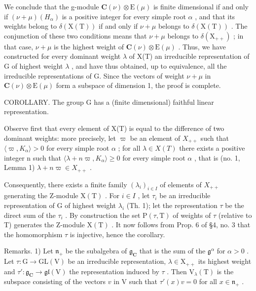 We conclude that the g-module \(\mathbf{C}(\nu)\otimes\mathrm{E}(\mu)\) is finite dimensional if and only if \((\nu+\mu)(H_{\alpha})\) is a positive integer for every simple root \(\alpha\) , and that its weights belong to \(\delta(\mathrm{X}(\mathrm{T}))\) if and only if \(\nu+\mu\) belongs to \(\delta(\mathrm{X}(\mathrm{T}))\) . The conjunction of these two conditions means that \(\nu+\mu\) belongs to \(\delta(\mathrm{X}_{++})\) ; in that case, \(\nu+\mu\) is the highest weight of \(\mathbf{C}(\nu)\otimes\mathrm{E}(\mu)\) . Thus, we have constructed for every dominant weight \(\lambda\) of X(T) an irreducible representation of G of highest weight \(\lambda\) , and have thus obtained, up to equivalence, all the irreducible representations of G. Since the vectors of weight \(\nu+\mu\) in \(\mathbf{C}(\nu)\otimes\mathrm{E}(\mu)\) form a subspace of dimension 1, the proof is complete.

COROLLARY. The group G has a (finite dimensional) faithful linear representation.

Observe first that every element of X(T) is equal to the difference of two dominant weights: more precisely, let \(\varpi\) be an element of \(X_{++}\) such that \(\langle\varpi,K_{\alpha}\rangle>0\) for every simple root \(\alpha\) ; for all \(\lambda\in X(T)\) there exists a positive integer n such that \(\langle\lambda+n\varpi,K_{\alpha}\rangle\geq0\) for every simple root \(\alpha\) , that is (no. 1, Lemma 1) \(\lambda+n\varpi\in X_{++}\) .

Consequently, there exists a finite family \((\lambda_{i})_{i\in I}\) of elements of \(X_{++}\) generating the Z-module \(\mathrm{X(T)}\) . For \(i\in I\) , let \(\tau_{i}\) be an irreducible representation of G of highest weight \(\lambda_{i}\) (Th. 1); let the representation \(\tau\) be the direct sum of the \(\tau_{i}\) . By construction the set \(\mathrm{P}(\tau,\mathrm{T})\) of weights of \(\tau\) (relative to T) generates the Z-module \(\mathrm{X(T)}\) . It now follows from Prop. 6 of §4, no. 3 that the homomorphism \(\tau\) is injective, hence the corollary.

Remarks. 1) Let \(\mathfrak{n}_{+}\) be the subalgebra of \(\mathfrak{g}_{\mathbf{C}}\) that is the sum of the \(\mathfrak{g}^{\alpha}\) for \(\alpha > 0\) . Let \(\tau: \mathrm{G} \to \mathrm{GL}(\mathrm{V})\) be an irreducible representation, \(\lambda \in \mathrm{X}_{++}\) its highest weight and \(\tau': \mathfrak{g}_{\mathbf{C}} \to \mathfrak{gl}(\mathrm{V})\) the representation induced by \(\tau\) . Then \(\mathrm{V}_{\lambda}(\mathrm{T})\) is the subspace consisting of the vectors \(v\) in \(\mathrm{V}\) such that \(\tau'(x)v = 0\) for all \(x \in \mathfrak{n}_{+}\) .

